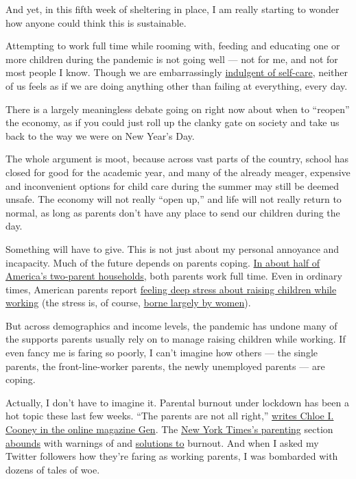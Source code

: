 And yet, in this fifth week of sheltering in place, I am really starting
to wonder how anyone could think this is sustainable.

Attempting to work full time while rooming with, feeding and educating
one or more children during the pandemic is not going well --- not for
me, and not for most people I know. Though we are embarrassingly
\href{https://www.nytimes.com/2019/01/09/opinion/meditation-internet.html}{indulgent
of self-care}, neither of us feels as if we are doing anything other
than failing at everything, every day.

There is a largely meaningless debate going on right now about when to
``reopen'' the economy, as if you could just roll up the clanky gate on
society and take us back to the way we were on New Year's Day.

The whole argument is moot, because across vast parts of the country,
school has closed for good for the academic year, and many of the
already meager, expensive and inconvenient options for child care during
the summer may still be deemed unsafe. The economy will not really
``open up,'' and life will not really return to normal, as long as
parents don't have any place to send our children during the day.

Something will have to give. This is not just about my personal
annoyance and incapacity. Much of the future depends on parents coping.
\href{https://www.theatlantic.com/politics/archive/2015/11/how-working-moms-are-changing-american-households/433332/}{In
about half of America's two-parent households}, both parents work full
time. Even in ordinary times, American parents report
\href{https://www.nytimes.com/2015/11/05/upshot/stressed-tired-rushed-a-portrait-of-the-modern-family.html}{feeling
deep stress about raising children while working} (the stress is, of
course,
\href{https://english.emmaclit.com/2017/05/20/you-shouldve-asked/}{borne
largely by women}).

But across demographics and income levels, the pandemic has undone many
of the supports parents usually rely on to manage raising children while
working. If even fancy me is faring so poorly, I can't imagine how
others --- the single parents, the front-line-worker parents, the newly
unemployed parents --- are coping.

Actually, I don't have to imagine it. Parental burnout under lockdown
has been a hot topic these last few weeks. ``The parents are not all
right,''
\href{https://gen.medium.com/parents-are-not-ok-66ab2a3e42d9}{writes
Chloe I. Cooney in the online magazine Gen}. The
\href{https://parenting.nytimes.com/?type=roundup\&link=intro}{New York
Times's parenting} section
\href{https://www.nytimes.com/2020/04/08/parenting/coronavirus-self-care.html}{abounds}
with warnings of and
\href{https://www.nytimes.com/2020/03/30/parenting/coronavirus-comfort-food-kids.html}{solutions
to} burnout. And when I asked my Twitter followers how they're faring as
working parents, I was bombarded with dozens of tales of woe.

